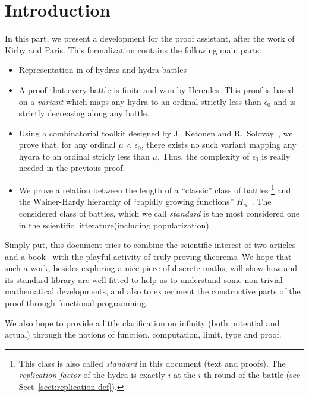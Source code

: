 \section*{Introduction}

In this part, we present a development  for the \coq{} proof assistant, after the work of Kirby and Paris. This formalization contains the following main parts:

\begin{itemize}
\item Representation in \coq{} of hydras and hydra battles
\item A proof that every battle is finite and won by Hercules. This proof is based on a \emph{variant} which maps any hydra to an ordinal strictly less than $\epsilon_0$ and is strictly decreasing along any battle.

\item Using a combinatorial toolkit designed by J.~Ketonen and R.~Solovay~\cite{KS81}, we prove that, for any ordinal $\mu<\epsilon_0$, there exists no such variant mapping any hydra to an ordinal stricly less than $\mu$. Thus, the complexity of $\epsilon_0$ is really needed in the previous proof.

\item We prove a relation between the length of a ``classic''  class of  battles \footnote{This class is also called \emph{standard} in this document (text and proofs). The \emph{replication factor} of the hydra is exactly $i$ at the $i$-th round of the battle (see Sect~\vref{sect:replication-def}).}
and the Wainer-Hardy hierarchy of ``rapidly growing functions'' $H_\alpha$~\cite{Wainer1970}. The considered class of battles, which we call \emph{standard}  is the most considered one in the scientific  litterature(including popularization).
\end{itemize}


Simply put, this document tries to combine the scientific interest of two articles~\cite{KP82, KS81} and a book~\cite{schutte} with the playful activity of truly proving theorems.
We hope  that such a work, besides exploring a nice piece of discrete maths, 
will show how \coq{} and its standard library are well fitted to help us to understand some non-trivial mathematical developments, and also to experiment the constructive parts of  the proof through functional programming.

 We also hope to provide a little clarification on infinity (both potential and actual) through the notions of function, computation, limit,
 type and proof.



